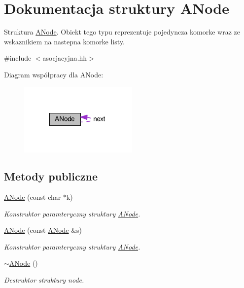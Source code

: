 \hypertarget{struct_a_node}{\section{Dokumentacja struktury A\-Node}
\label{struct_a_node}
}


Struktura \hyperlink{struct_a_node}{A\-Node}. Obiekt tego typu reprezentuje pojedyncza komorke wraz ze wskaznikiem na nastepna komorke listy.  




{\ttfamily \#include $<$asocjacyjna.\-hh$>$}



Diagram współpracy dla A\-Node\-:\nopagebreak
\begin{figure}[H]
\begin{center}
\leavevmode
\includegraphics[width=165pt]{struct_a_node__coll__graph}
\end{center}
\end{figure}
\subsection*{Metody publiczne}
\begin{DoxyCompactItemize}
\item 
\hyperlink{struct_a_node_a932a13512cd7d15fe86c62b5292d66c1}{A\-Node} (const char $\ast$k)
\begin{DoxyCompactList}\small\item\em Konstruktor paramteryczny struktury \hyperlink{struct_a_node}{A\-Node}. \end{DoxyCompactList}\item 
\hyperlink{struct_a_node_a8f44e3ed23b669c075640f3c9976d9f5}{A\-Node} (const \hyperlink{struct_a_node}{A\-Node} \&s)
\begin{DoxyCompactList}\small\item\em Konstruktor paramteryczny struktury \hyperlink{struct_a_node}{A\-Node}. \end{DoxyCompactList}\item 
\hyperlink{struct_a_node_aec880ec60e95396aba5ffdc6ce0a4e8d}{$\sim$\-A\-Node} ()
\begin{DoxyCompactList}\small\item\em Destruktor struktury node. \end{DoxyCompactList}\end{DoxyCompactItemize}
